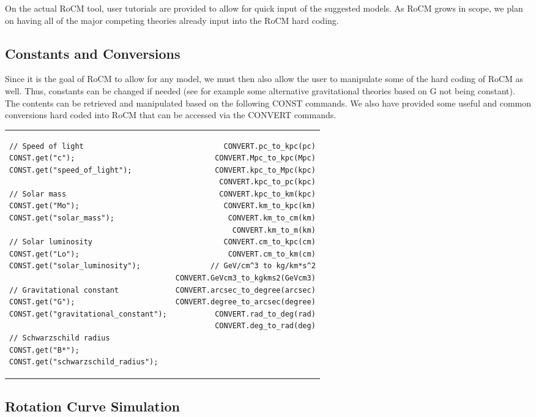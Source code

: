 \documentclass[conference]{IEEEtran-modified}
\begin{document}
On the actual RoCM tool, user tutorials are provided to allow for quick input of the suggested models.  As RoCM grows in scope, we plan on having all of the major competing theories already input into the RoCM hard coding.


\subsection{Constants and Conversions}
Since it is the goal of RoCM to allow for any model, we must then also allow the user to manipulate some of the hard coding of RoCM as well.  Thus, constants can be changed if needed (see for example some alternative gravitational theories based on G not being constant). The contents can be retrieved and manipulated based on the following CONST commands. We also have provided some useful and common conversions hard coded into RoCM that can be accessed via the CONVERT commands.\begin{center}
\begin{tabular}{l !{\color{lightgray}\vrule} r}
\begin{lstlisting}
// Speed of light
CONST.get("c");
CONST.get("speed_of_light");

// Solar mass
CONST.get("Mo");
CONST.get("solar_mass");

// Solar luminosity
CONST.get("Lo");
CONST.get("solar_luminosity");

// Gravitational constant
CONST.get("G");
CONST.get("gravitational_constant");

// Schwarzschild radius
CONST.get("B*");
CONST.get("schwarzschild_radius");
\end{lstlisting}
&
\begin{lstlisting}
CONVERT.pc_to_kpc(pc)
CONVERT.Mpc_to_kpc(Mpc)
CONVERT.kpc_to_Mpc(kpc)
CONVERT.kpc_to_pc(kpc)
CONVERT.kpc_to_km(kpc)
CONVERT.km_to_kpc(km)
CONVERT.km_to_cm(km)
CONVERT.km_to_m(km)
CONVERT.cm_to_kpc(cm)
CONVERT.cm_to_km(cm)
// GeV/cm^3 to kg/km*s^2
CONVERT.GeVcm3_to_kgkms2(GeVcm3)
CONVERT.arcsec_to_degree(arcsec)
CONVERT.degree_to_arcsec(degree)
CONVERT.rad_to_deg(rad)
CONVERT.deg_to_rad(deg)
\end{lstlisting}
\end{tabular}
\end{center}


\subsection{Rotation Curve Simulation}
\end{document}
